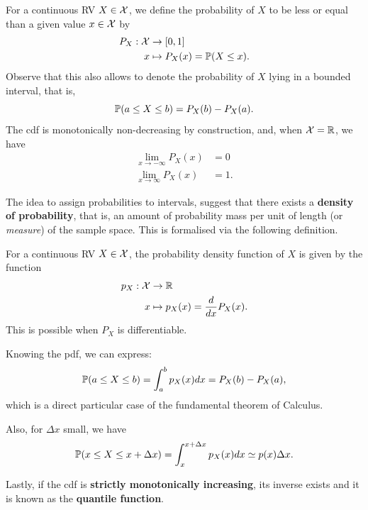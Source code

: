 \begin{definition} 
\label{def:cdf}
For a continuous RV $X\in{\mathcal X}$, we define the probability of $X$ to be less or equal than a given value $x\in{\mathcal X}$ by 
\begin{align}
 	P_X: {\mathcal X} &\to [0,1]\\
 	x &\mapsto P_X(x)=\mathbb{P}(X\leq x).
 \end{align} 
Observe that this also allows to denote the probability of $X$ lying in a bounded interval, that is, 
\begin{equation}
	\mathbb{P}(a\leq X \leq b) = P_X(b) - P_X(a).
\end{equation}
The cdf is monotonically non-decreasing by construction, and, when ${\mathcal X} = \mathbb{R}$, we have 
\begin{align}
	\lim_{x\to -\infty} P_X(x) & = 0\\
	\lim_{x\to \infty} P_X(x) & = 1.
\end{align}
\end{definition}

The idea to assign probabilities to intervals, suggest that there exists a \textbf{density of probability}, that is, an amount of probability mass per unit of length (or \emph{measure}) of the sample space. This is formalised via the following definition. 


\begin{definition} 
\label{def:pdf}
For a continuous RV $X\in{\mathcal X}$, the probability density function of $X$ is given by the function 
\begin{align}
 	p_X: {\mathcal X} &\to \mathbb{R}\\
 	x &\mapsto p_X(x)=\frac{d}{dx} P_X(x).
 \end{align} 
 This is possible when $P_X$ is differentiable. 
\end{definition}
Knowing the pdf, we can express: 
\begin{equation}
	\mathbb{P}(a\leq X \leq b) = \int_a^bp_X(x)dx = P_X(b) - P_X(a),
\end{equation}
which is a direct particular case of the fundamental theorem of Calculus. 

Also, for $\Delta x$ small, we have
\begin{equation}
	\mathbb{P}(x\leq X \leq x + \Delta x) = \int_x^{x+\Delta x}p_X(x)dx \simeq p(x)\Delta x.
\end{equation}

Lastly, if the cdf is \textbf{strictly monotonically increasing}, its inverse exists and it is known as the \textbf{quantile function}. 

